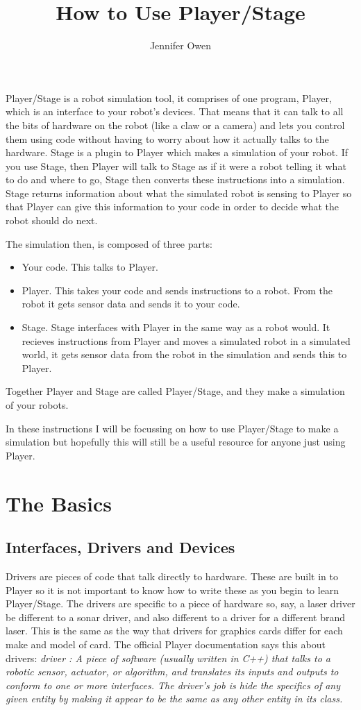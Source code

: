 \documentclass{article}
\title{How to Use Player/Stage}
\author{Jennifer Owen}
\begin{document}
\maketitle
Player/Stage is a robot simulation tool, it comprises of one program, Player, which is an interface to your robot's devices. That means that it can talk to all the bits of hardware on the robot (like a claw or a camera)  and lets you control them using code without having to worry about how it actually talks to the hardware. Stage is a plugin to Player which makes a simulation of your robot. If you use Stage, then Player will talk to Stage as if it were a robot telling it what to do and where to go, Stage then converts these instructions into a simulation. Stage returns information about what the simulated robot is sensing to Player so that Player can give this information to your code in order to decide what the robot should do next.

The simulation then, is composed of three parts:
\begin{itemize}
\item Your code. This talks to Player.
\item Player. This takes your code and sends instructions to a robot. From the robot it gets sensor data and sends it to your code.
\item Stage. Stage interfaces with Player in the same way as a robot would. It recieves instructions from Player and moves a simulated robot in a simulated world, it gets sensor data from the robot in the simulation and sends this to Player.
\end{itemize}
Together Player and Stage are called Player/Stage, and they make a simulation of your robots.

In these instructions I will be focussing on how to use Player/Stage to make a simulation but hopefully this will still be a useful resource for anyone just using Player.

\section{The Basics}

\subsection{Interfaces, Drivers and Devices}
Drivers are pieces of code that talk directly to hardware. These are built in to Player so it is not important to know how to write these as you begin to learn Player/Stage. The drivers are specific to a piece of hardware so, say, a laser driver be different to a sonar driver, and also different to a driver for a different brand laser. This is the same as the way that drivers for graphics cards differ for each make and model of card. The official Player documentation says this about drivers:\newline
\emph{driver : A piece of software (usually written in C++) that talks to a robotic sensor, actuator, or algorithm, and translates its inputs and outputs to conform to one or more interfaces. The driver's job is hide the specifics of any given entity by making it appear to be the same as any other entity in its class. }\newline
\end{document}
